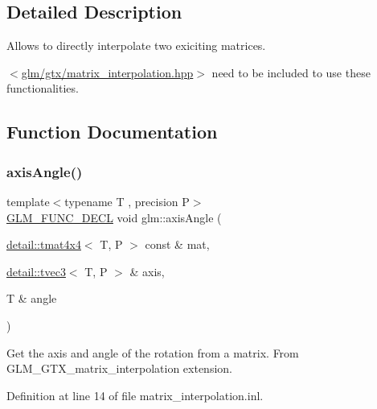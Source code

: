 \subsection{Detailed Description}
Allows to directly interpolate two exiciting matrices. 

$<$\hyperlink{matrix__interpolation_8hpp}{glm/gtx/matrix\+\_\+interpolation.\+hpp}$>$ need to be included to use these functionalities. 

\subsection{Function Documentation}
\mbox{\label{group__gtx__matrix__interpolation_gadf049332345bf754b63fe24a914f8fac}} 
\subsubsection{\texorpdfstring{axis\+Angle()}{axisAngle()}}
{\footnotesize\ttfamily template$<$typename T , precision P$>$ \\
\hyperlink{setup_8hpp_ab2d052de21a70539923e9bcbf6e83a51}{G\+L\+M\+\_\+\+F\+U\+N\+C\+\_\+\+D\+E\+CL} void glm\+::axis\+Angle (\begin{DoxyParamCaption}\item[{\hyperlink{structglm_1_1detail_1_1tmat4x4}{detail\+::tmat4x4}$<$ T, P $>$ const \&}]{mat,  }\item[{\hyperlink{structglm_1_1detail_1_1tvec3}{detail\+::tvec3}$<$ T, P $>$ \&}]{axis,  }\item[{T \&}]{angle }\end{DoxyParamCaption})}

Get the axis and angle of the rotation from a matrix. From G\+L\+M\+\_\+\+G\+T\+X\+\_\+matrix\+\_\+interpolation extension. 

Definition at line 14 of file matrix\+\_\+interpolation.\+inl.

\mbox{\label{group__gtx__matrix__interpolation_gafc6982aa7c8e8198b21f038f51fc4b90}} 
